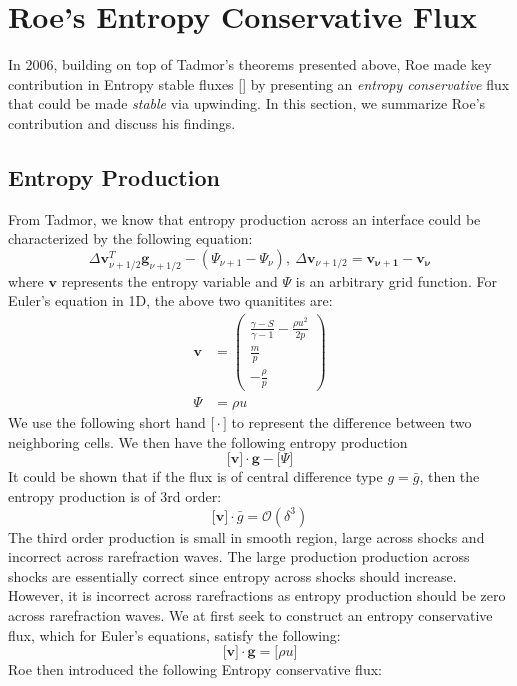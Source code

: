 \documentclass[a4paper]{article}
\numberwithin{equation}{section}
\begin{document}
\section{Roe's Entropy Conservative Flux}
In 2006, building on top of Tadmor's theorems presented above, Roe made key contribution in Entropy stable fluxes [] by presenting an \textit{entropy conservative} flux that could be made \textit{stable} via upwinding. In this section, we summarize Roe's contribution and discuss his findings.

\subsection{Entropy Production}
From Tadmor, we know that entropy production across an interface could be characterized by the following equation:
\begin{equation}
    \Delta \mathbf{v}_{\nu + 1/2}^T \mathbf{g}_{\nu + 1/2} - (\Psi_{\nu + 1} - \Psi_\nu), \ \Delta \mathbf{v}_{\nu + 1/2} = \mathbf{v_{\nu + 1}} - \mathbf{v}_\mathbf{\nu}
\end{equation}
where $\mathbf{v}$ represents the entropy variable and $\Psi$ is an arbitrary grid function. For Euler's equation in 1D, the above two quanitites are:
\begin{equation}
    \begin{split}
        \mathbf{v} &= 
        \begin{pmatrix}
            \frac{\gamma - S}{\gamma - 1}-\frac{\rho u^2}{2p} \\
            \frac{m}{p}\\
            -\frac{\rho}{p}
        \end{pmatrix}\\
        \Psi &= \rho u
    \end{split}
\end{equation} 
We use the following short hand $\big[\cdot \big]$ to represent the difference between two neighboring cells. We then have the following entropy production
\begin{equation}
    \big[\mathbf{v}\big] \cdot \mathbf{g} - \big[\Psi\big]
\end{equation}
It could be shown that if the flux is of central difference type $g = \bar{g}$, then the entropy production is of 3rd order:
\begin{equation}
    \big[\mathbf{v}\big] \cdot \bar{g} = \mathcal{O}(\delta^3)
\end{equation}
The third order production is small in smooth region, large across shocks and incorrect across rarefraction waves. The large production production across shocks are essentially correct since entropy across shocks should increase. However, it is incorrect across rarefractions as entropy production should be zero across rarefraction waves. We at first seek to construct an entropy conservative flux, which for Euler's equations, satisfy the following:
\begin{equation}
    \big[\mathbf{v}\big] \cdot \mathbf{g} = \big[\rho u\big]
\end{equation}
Roe then introduced the following Entropy conservative flux:
\end{document}
